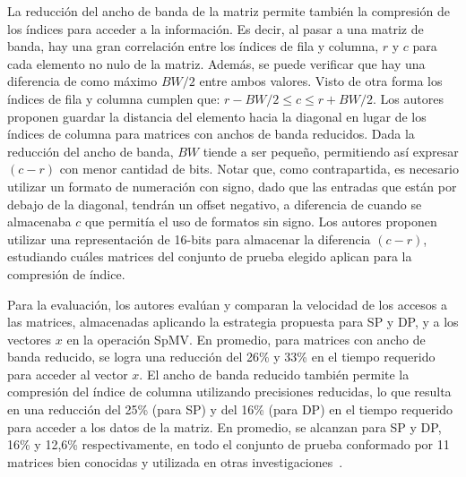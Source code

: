 La reducción del ancho de banda de la matriz permite también %
la compresión de los índices para acceder a la información. Es decir, al pasar a una matriz de banda, hay una gran correlación entre los índices de fila y columna, $r$  y $c$ para cada elemento no nulo de la matriz. Además, se puede verificar que hay una diferencia de como máximo $BW/2$ entre ambos valores. Visto de otra forma los índices de fila y columna cumplen que: $r - BW/2 \leq c \leq r + BW/2$. Los autores proponen guardar la distancia del elemento hacia la diagonal en lugar de los índices de columna para matrices con anchos de banda reducidos. %
 Dada la reducción del ancho de banda, $BW$ tiende a ser pequeño, permitiendo así expresar $(c -r)$ con menor cantidad de bits. Notar que, como contrapartida, es necesario utilizar un formato de numeración con signo, dado que las entradas que están por debajo de la diagonal, tendrán un offset negativo, a diferencia de cuando se almacenaba $c$ que permitía el uso de formatos sin signo. Los autores proponen utilizar una representación de 16-bits para almacenar la diferencia $(c -r)$, estudiando cuáles matrices del conjunto de prueba elegido aplican para la compresión de índice.
 
Para la evaluación, los autores evalúan y comparan la velocidad de los accesos a las matrices, almacenadas aplicando la estrategia propuesta para SP y DP, y a los vectores $x$ en la operación SpMV. En promedio, para matrices con ancho de banda reducido, se logra una reducción del 26\% y 33\% en el tiempo requerido para acceder al vector $x$. El ancho de banda reducido también permite la compresión del índice de columna utilizando precisiones reducidas, lo que resulta en una reducción del 25\% (para SP) y del 16\% (para DP) en el tiempo requerido para acceder a los datos de la matriz. En promedio, se alcanzan para SP y DP, 16\% y 12,6\% respectivamente, en todo el conjunto de prueba conformado por 11 matrices bien conocidas y utilizada en otras investigaciones~\cite{Bell2009}.


